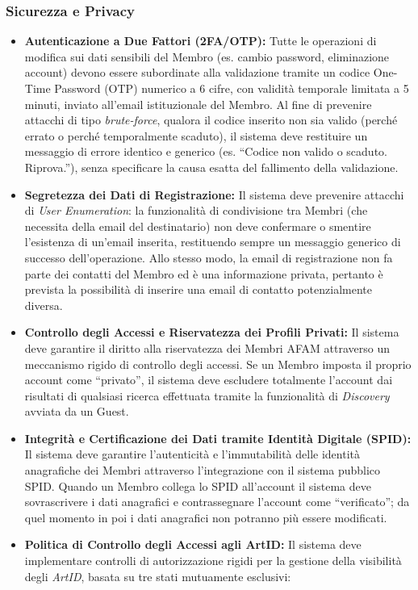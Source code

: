 \subsubsection{Sicurezza e Privacy}
\begin{itemize}
    \item \textbf{Autenticazione a Due Fattori (2FA/OTP):} Tutte le operazioni di modifica sui dati sensibili del Membro (es. cambio password, eliminazione account) devono essere subordinate alla validazione tramite un codice One-Time Password (OTP) numerico a 6 cifre, con validità temporale limitata a 5 minuti, inviato all'email istituzionale del Membro. 
    Al fine di prevenire attacchi di tipo \textit{brute-force}, qualora il codice inserito non sia valido (perché errato o perché temporalmente scaduto), il sistema deve restituire un messaggio di errore identico e generico (es. ``Codice non valido o scaduto. Riprova.''), senza specificare la causa esatta del fallimento della validazione.
    \item \textbf{Segretezza dei Dati di Registrazione:} Il sistema deve prevenire attacchi di \textit{User Enumeration}: la funzionalità di condivisione tra Membri (che necessita della email del destinatario) non deve confermare o smentire l'esistenza di un'email inserita, restituendo sempre un messaggio generico di successo dell'operazione. Allo stesso modo, la email di registrazione non fa parte dei contatti del Membro ed è una informazione privata, pertanto è prevista la possibilità di inserire una email di contatto potenzialmente diversa. 
    \item \textbf{Controllo degli Accessi e Riservatezza dei Profili Privati:} Il sistema deve garantire il diritto alla riservatezza dei Membri AFAM attraverso un meccanismo rigido di controllo degli accessi. Se un Membro imposta il proprio account come ``privato'', il sistema deve escludere totalmente l'account dai risultati di qualsiasi ricerca effettuata tramite la funzionalità di \textit{Discovery} avviata da un Guest.
    \item \textbf{Integrità e Certificazione dei Dati tramite Identità Digitale (SPID):} Il sistema deve garantire l'autenticità e l'immutabilità delle identità anagrafiche dei Membri attraverso l'integrazione con il sistema pubblico SPID. 
    Quando un Membro collega lo SPID all'account il sistema deve sovrascrivere i dati anagrafici e contrassegnare l'account come ``verificato''; da quel momento in poi i dati anagrafici non potranno più essere modificati. 
    \item \textbf{Politica di Controllo degli Accessi agli ArtID:} Il sistema deve implementare controlli di autorizzazione rigidi per la gestione della visibilità degli \textit{ArtID}, basata su tre stati mutuamente esclusivi:

\end{itemize}
